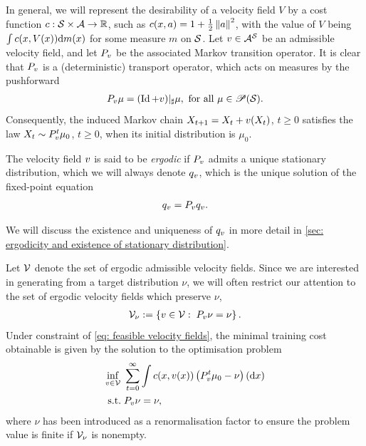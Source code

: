 \documentclass[twoside,10pt]{../jmlr}
\begin{document}
In general, we will represent the desirability of a velocity field $V$ by a cost function $c:\mathcal{S}\times\mathcal{A}\to\mathbb{R}$, such as $c(x,a)=1+\frac12\left\lVert a\right\rVert^2$, with the value of $V$ being 
$\int c(x,V(x))\mathrm{d} m(x)$ for some measure $m$ on $\mathcal{S}$.
Let $v\in \mathcal{A}^{\mathcal{S}}$ be an admissible velocity field, and let $P_v$ be the associated Markov transition operator. It is clear that $P_v$ is a (deterministic) transport operator, which acts on measures by the pushforward
\begin{align}
    P_v\mu=(\operatorname{Id}+v)\vert_\sharp\mu, \mbox{ for all } \mu\in\mathscr{P}(\mathcal{S}).
\end{align}
Consequently, the induced Markov chain $X_{t+1}=X_t+v(X_t)$, $t\ge0$ satisfies the law $X_t\sim P_v^t\mu_0$, $t\ge0$, when its initial distribution is $\mu_0$. 

The velocity field $v$ is said to be \emph{ergodic} if $P_v$ admits a unique stationary distribution, which we will always denote $q_v$, which is the unique solution of the fixed-point equation
\begin{align}
    q_v=P_v q_v.
\end{align}

We will discuss the existence and uniqueness of $q_v$ in more detail in \cref{sec: ergodicity and existence of stationary distribution}.


Let $\mathcal{V}$ denote the set of ergodic admissible velocity fields.
Since we are interested in generating from a target distribution $\nu$, we will often restrict our attention to the set of ergodic velocity fields which preserve $\nu$, \ie
\begin{align}
    \mathcal{V}_\nu:=\left\{v\in\mathcal{V}:\;P_v\nu=\nu\right\}. \label{eq: feasible velocity fields}
\end{align}
Under constraint of \eqref{eq: feasible velocity fields}, the minimal training cost obtainable is given by the solution to the optimisation problem 
\begin{align}
    \inf_{v\in\mathcal{V}}\ & \sum_{t=0}^{\infty}\int c(x,v(x))\left(P_v^t\mu_0-\nu\right)(\mathrm{d} x) \label{eq: introduction of primal bias optimal problem}\\
    \mbox{s.t.}\;& P_v\nu=\nu, \notag
\end{align}
where $\nu$ has been introduced as a renormalisation factor to ensure the problem value is finite if $\mathcal{V}_\nu$ is nonempty. 
\end{document}
